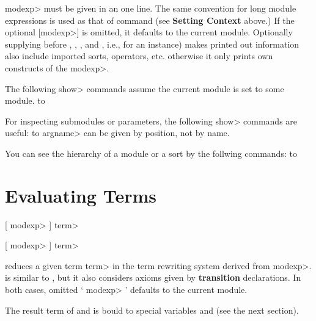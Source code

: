 \documentclass[a4paper,oneside,twocolumn]{memoir}
\begin{document}
\<modexp> must be given in an one line. 
The same convention for long module expressions is used as that of
 command (see {\bf Setting Context} above.)
If the optional [\<modexp>] is omitted, it defaults to the current
module. 
Optionally supplying  before , ,  
, and , i.e.,  for an instance)
makes printed out information also include imported sorts, operators, etc.
otherwise it only prints own constructs of the \<modexp>.

The following \<show> commands assume the current
module is set to some module.
\paralign to 

For inspecting submodules or parameters, the following \<show>
commands are useful:
\paralign to 
\<argname> can be given by position, not by name. 

You can see the hierarchy of a module or a sort by the follwing
 commands:
\paralign to 

\section{Evaluating Terms}

 [ \<modexp> \kbd{:}] \<term> 

 [ \<modexp> \kbd{:}] \<term> 

 reduces a given term \<term> in the term rewriting system
derived from \<modexp>.
 is similar to , but it also considers axioms 
given by {\bf transition} declarations.
In both cases, omitted ` \<modexp> \kbd{:}' defaults to the current module.

The result term of  and  is bould to 
special variables  and  (see the next
section). 
\end{document}
